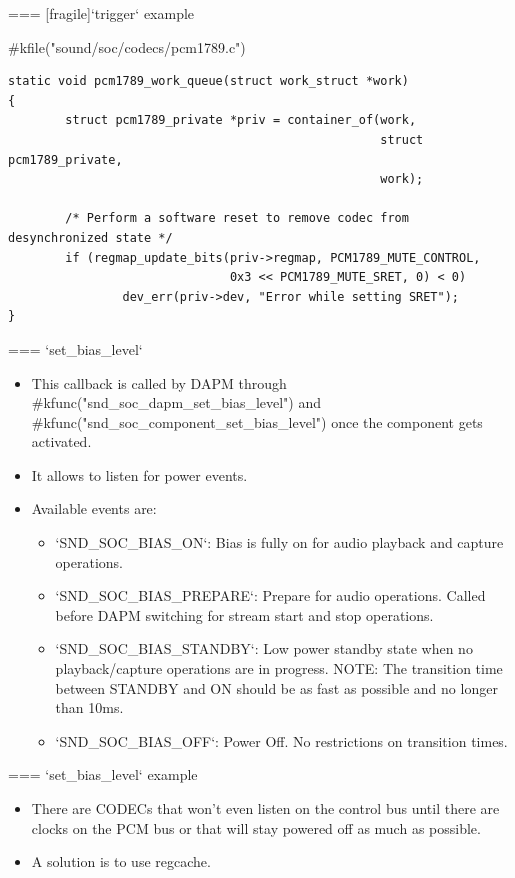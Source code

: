 === [fragile]{`trigger` example}
  \begin{block}{#kfile("sound/soc/codecs/pcm1789.c")}
    \fontsize{8}{8}\selectfont
    \begin{verbatim}
static void pcm1789_work_queue(struct work_struct *work)
{
        struct pcm1789_private *priv = container_of(work,
                                                    struct pcm1789_private,
                                                    work);

        /* Perform a software reset to remove codec from desynchronized state */
        if (regmap_update_bits(priv->regmap, PCM1789_MUTE_CONTROL,
                               0x3 << PCM1789_MUTE_SRET, 0) < 0)
                dev_err(priv->dev, "Error while setting SRET");
}
    \end{verbatim}
  \end{block}


=== {`set_bias_level`}
  \begin{itemize}
  \item This callback is called by DAPM through
    #kfunc("snd_soc_dapm_set_bias_level") and
    #kfunc("snd_soc_component_set_bias_level") once the component gets
    activated.
  \item It allows to listen for power events.
  \item Available events are:
    \begin{itemize}
    \item `SND_SOC_BIAS_ON`: Bias is fully on for audio playback
      and capture operations.
    \item `SND_SOC_BIAS_PREPARE`: Prepare for audio operations.
      Called before DAPM switching for
      stream start and stop operations.
    \item `SND_SOC_BIAS_STANDBY`: Low power standby state when no
      playback/capture operations are
      in progress. NOTE: The transition time between STANDBY and ON
      should be as fast as possible and no longer than 10ms.
    \item `SND_SOC_BIAS_OFF`: Power Off. No restrictions on
      transition times.
    \end{itemize}
  \end{itemize}


=== {`set_bias_level` example}
  \begin{itemize}
  \item There are CODECs that won't even listen on the control
    bus until there are clocks on the PCM bus or that will stay
    powered off as much as possible.
  \item A solution is to use regcache.
  \end{itemize}


